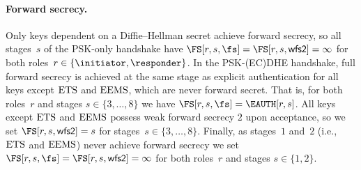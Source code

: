 \paragraph{Forward secrecy.}
Only keys dependent on a Diffie--Hellman secret achieve forward secrecy, so all stages~$s$ of the PSK-only handshake have $\FS[r, s, \fs] = \FS[r, s, \wfstwo] = \infty$ for both roles~$r \in \{\initiator, \responder\}$.
In the PSK-(EC)DHE handshake, full forward secrecy is achieved at the same stage as explicit authentication for all keys except $\mathrm{ETS}$ and $\mathrm{EEMS}$, which are never forward secret.
That is, for both roles~$r$ and stages $s \in \{3,\dotsc,8\}$ we have $\FS[r, s, \fs] = \EAUTH[r, s]$.
All keys except $\mathrm{ETS}$ and $\mathrm{EEMS}$ possess weak forward secrecy $2$ upon acceptance, so we set $\FS[r, s, \wfstwo] = s$ for stages~$s \in \{3,\dotsc,8\}$.
Finally, as stages~$1$ and~$2$ (i.e., $\mathrm{ETS}$ and $\mathrm{EEMS}$) never achieve forward secrecy we set $\FS[r, s, \fs] = \FS[r, s, \wfstwo] = \infty$ for both roles~$r$ and stages $s \in \{1,2\}$.

%

